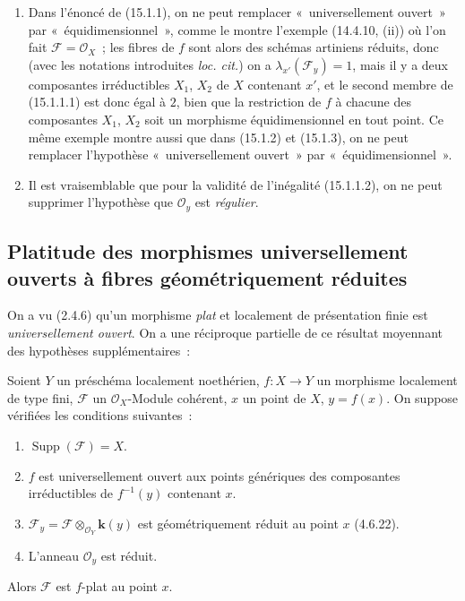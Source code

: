 \begin{remarks}[15.1.4]
\label{IV.15.1.4-fr}
\begin{enumerate}[label=(\roman*)]
  \item Dans l'énoncé de (15.1.1), on ne peut remplacer «~universellement
  ouvert~» par «~équidimensionnel~», comme le montre l'exemple (14.4.10, (ii)) où
  l'on fait $\mathcal F=\mathcal O_X$~; les fibres de $f$ sont alors des schémas
  artiniens réduits, donc (avec les notations introduites \emph{loc. cit.}) on a
  $\lambda_{x'}(\mathcal F_y)=1$, mais il y a deux composantes irréductibles
  $X_1$, $X_2$ de $X$ contenant $x'$, et le second membre de (15.1.1.1) est donc
  égal à $2$, bien que la restriction de $f$ à chacune des composantes $X_1$,
  $X_2$ soit un morphisme équidimensionnel en tout point. Ce même exemple montre
  aussi que dans (15.1.2) et (15.1.3), on ne peut remplacer l'hypothèse
  «~universellement ouvert~» par «~équidimensionnel~».
  \item Il est vraisemblable que pour la validité de l'inégalité (15.1.1.2), on
  ne peut supprimer l'hypothèse que $\mathcal O_y$ est \emph{régulier}.
\end{enumerate}
\end{remarks}

\subsection{Platitude des morphismes universellement ouverts à fibres géométriquement réduites}
\label{subsection:IV.15.2-fr}

\begin{env}[15.2.1]
\label{IV.15.2.1-fr}
On a vu (2.4.6) qu'un morphisme \emph{plat} et localement de présentation finie
est \emph{universellement ouvert}. On a une réciproque partielle de ce résultat
moyennant des hypothèses supplémentaires~:
\end{env}

\begin{theorem}[15.2.2]
\label{IV.15.2.2-fr}
Soient $Y$ un préschéma localement noethérien, $f:X\to Y$ un morphisme localement
de type fini, $\mathcal F$ un $\mathcal O_X$-Module cohérent, $x$ un point de
$X$, $y=f(x)$. On suppose vérifiées les conditions suivantes~:
\begin{enumerate}[label=(\roman*)]
  \item $\operatorname{Supp}(\mathcal F)=X$.
  \item $f$ est universellement ouvert aux points génériques des composantes
  irréductibles de $f^{-1}(y)$ contenant $x$.
  \item $\mathcal F_y=\mathcal F\otimes_{\mathcal O_Y}\mathbf{k}(y)$ est
  géométriquement réduit au point $x$ (4.6.22).
  \item L'anneau $\mathcal O_y$ est réduit.
\end{enumerate}
Alors $\mathcal F$ est $f$-plat au point $x$.
\end{theorem}

